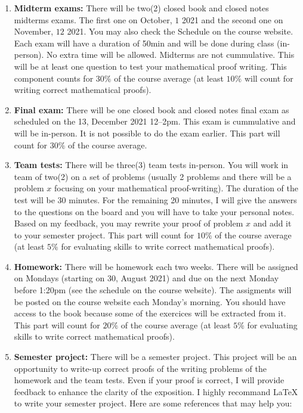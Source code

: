 \documentclass[12pt]{amsart}
\begin{document}
\begin{enumerate}
\item {\bf Midterm exams:} There will be two(2) closed book and closed notes midterms exams. The first one on October, $1$ 2021 and the second one on November, $12$ 2021. You may also check the Schedule on the course website.
Each exam will have a duration of 50min and will be done during class (in-person). No extra time will be allowed. Midterms are not cummulative. This will be at least one question to test your mathematical proof writing. %
This component counts for $30\%$ of the course average (at least $10\%$ will count for writing correct mathematical proofs).
\item {\bf Final exam:} There will be one closed book and closed notes final exam as scheduled on the 13, December 2021 12--2pm. This exam is cummulative and will be in-person. It is not possible to do the exam earlier. This part will count for $30\%$ of the course average.
\item{\bf Team tests:} There will be three(3) team tests in-person. You will work in team of two(2) on a set of problems (usually 2 problems and there will be a problem $x$ focusing on your mathematical proof-writing). The duration of the test will be 30 minutes. For the remaining 20 minutes, I will give the answers to the questions on the board and you will have to take your personal notes. %
Based on my feedback, you may rewrite your proof of problem $x$ and add it to your semester project. This part will count for $10\%$ of the course average (at least $5\%$ for evaluating skills to write correct mathematical proofs).
\item{\bf Homework:} There will be homework each two weeks. There will be assigned on Mondays (starting on 30, August 2021) and due on the next Monday before 1:20pm (see the schedule on the course website). The assigments will be posted on the course website each Monday's morning. You should have access to the book because some of the exercices will be extracted from it. This part will count for $20\%$ of the course average (at least $5\%$ for evaluating skills to write correct mathematical proofs). 
\item{\bf Semester project:} There will be a semester project. This project will be an opportunity to write-up correct proofs of the writing problems of the homework and the team tests. Even if your proof is correct, I will provide feedback to enhance the clarity of the exposition. I highly recommand {\LaTeX} to write your semester project. Here are some references that may help you:

\end{enumerate}
\end{document}
